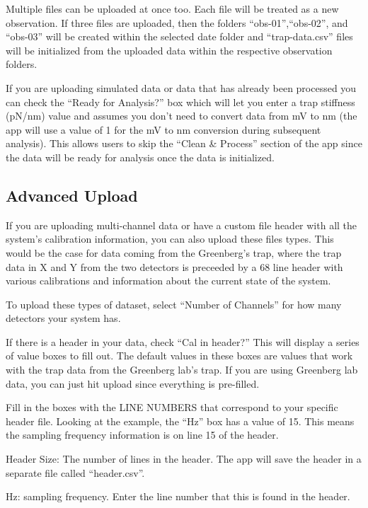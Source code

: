 \documentclass[
]{book}
\begin{document}
Multiple files can be uploaded at once too. Each file will be treated as a new observation. If three files are uploaded, then the folders ``obs-01'',``obs-02'', and ``obs-03'' will be created within the selected date folder and ``trap-data.csv'' files will be initialized from the uploaded data within the respective observation folders.

If you are uploading simulated data or data that has already been processed you can check the ``Ready for Analysis?'' box which will let you enter a trap stiffness (pN/nm) value and assumes you don't need to convert data from mV to nm (the app will use a value of 1 for the mV to nm conversion during subsequent analysis). This allows users to skip the ``Clean \& Process'' section of the app since the data will be ready for analysis once the data is initialized.

\subsection{Advanced Upload}\label{advanced-upload}

If you are uploading multi-channel data or have a custom file header with all the system's calibration information, you can also upload these files types. This would be the case for data coming from the Greenberg's trap, where the trap data in X and Y from the two detectors is preceeded by a 68 line header with various calibrations and information about the current state of the system.

To upload these types of dataset, select ``Number of Channels'' for how many detectors your system has.

If there is a header in your data, check ``Cal in header?'' This will display a series of value boxes to fill out. The default values in these boxes are values that work with the trap data from the Greenberg lab's trap. If you are using Greenberg lab data, you can just hit upload since everything is pre-filled.

Fill in the boxes with the LINE NUMBERS that correspond to your specific header file. Looking at the example, the ``Hz'' box has a value of 15. This means the sampling frequency information is on line 15 of the header.

Header Size: The number of lines in the header. The app will save the header in a separate file called ``header.csv''.

Hz: sampling frequency. Enter the line number that this is found in the header.
\end{document}
